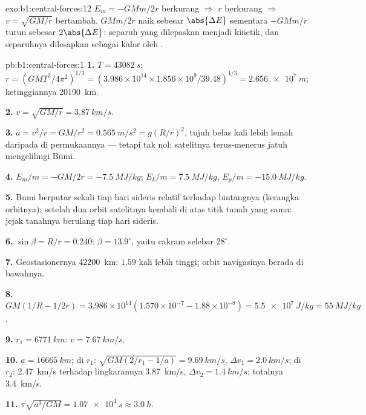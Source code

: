 \begin{solution}{exo:b1:central-forces:12}
$E_m = -GMm/2r$ berkurang $\Rightarrow$ $r$ berkurang $\Rightarrow$ $v =
\sqrt{GM/r}$ bertambah.  $GMm/2r$ naik sebesar $\abs{\Delta E}$
sementara  $-GMm/r$ turun sebesar $2\abs{\Delta E}$:
separuh  yang dilepaskan menjadi kinetik, dan separuhnya
dilesapkan sebagai kalor oleh .
\end{solution}

\begin{solution}{pb:b1:central-forces:1}
\textbf{1.} $T = \qty{43082}{s}$: $r = (GMT^2/4\pi^2)^{1/3} = (3.986\times10^{14}
\times 1.856\times10^9/39.48)^{1/3} = \qty{2.656e7}{m}$; ketinggiannya
\qty{20190}{km}.

\textbf{2.} $v = \sqrt{GM/r} = \qty{3.87}{km/s}$.

\textbf{3.} $a = v^2/r = GM/r^2 = \qty{0.565}{m/s^2} = g(R/r)^2$, tujuh
belas kali lebih lemah daripada di permukaannya --- tetapi tak nol:
satelitnya terus-menerus jatuh mengelilingi Bumi.

\textbf{4.} $E_m/m = -GM/2r = \qty{-7.5}{MJ/kg}$; $E_k/m = \qty{+7.5}{MJ/kg}$,
$E_p/m = \qty{-15.0}{MJ/kg}$.

\textbf{5.} Bumi berputar sekali tiap hari sideris relatif terhadap
bintangnya (kerangka orbitnya); setelah dua orbit satelitnya kembali di
atas titik tanah yang sama: jejak tanahnya berulang tiap hari sideris.

\textbf{6.} $\sin\beta = R/r = 0.240$: $\beta = 13.9^\circ$, yaitu cakram
selebar $28^\circ$.

\textbf{7.} Geostasionernya \qty{42200}{km}: $1.59$ kali lebih tinggi;
orbit navigasinya berada di bawahnya.

\textbf{8.} $GM(1/R - 1/2r) = 3.986\times10^{14}(1.570\times10^{-7} - 1.88\times
10^{-8}) = \qty{5.5e7}{J/kg} = \qty{55}{MJ/kg}$.

\textbf{9.} $r_1 = \qty{6771}{km}$: $v = \qty{7.67}{km/s}$.

\textbf{10.} $a = \qty{16665}{km}$; di $r_1$: $\sqrt{GM(2/r_1 - 1/a)} =
\qty{9.69}{km/s}$, $\Delta v_1 = \qty{2.0}{km/s}$; di $r_2$: \qty{2.47}{km/s}
terhadap lingkarannya \qty{3.87}{km/s}, $\Delta v_2 = \qty{1.4}{km/s}$; totalnya
\qty{3.4}{km/s}.

\textbf{11.} $\pi\sqrt{a^3/GM} = \qty{1.07e4}{s} \approx \qty{3.0}{h}$.


\end{solution}
